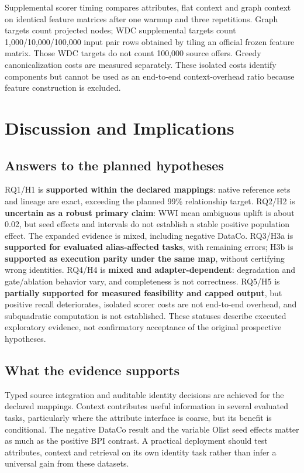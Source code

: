 \documentclass[11pt,letterpaper]{article}
\begin{document}
Supplemental scorer timing compares attributes, flat context and graph context on identical feature matrices after one warmup and three repetitions. Graph targets count projected nodes; WDC supplemental targets count 1,000/10,000/100,000 input pair rows obtained by tiling an official frozen feature matrix. Those WDC targets do not count 100,000 source offers. Greedy canonicalization costs are measured separately. These isolated costs identify components but cannot be used as an end-to-end context-overhead ratio because feature construction is excluded.

\section{Discussion and Implications}
\subsection{Answers to the planned hypotheses}
RQ1/H1 is \textbf{supported within the declared mappings}: native reference sets and lineage are exact, exceeding the planned 99\% relationship target. RQ2/H2 is \textbf{uncertain as a robust primary claim}: WWI mean ambiguous uplift is about 0.02, but seed effects and intervals do not establish a stable positive population effect. The expanded evidence is mixed, including negative DataCo. RQ3/H3a is \textbf{supported for evaluated alias-affected tasks}, with remaining errors; H3b is \textbf{supported as execution parity under the same map}, without certifying wrong identities. RQ4/H4 is \textbf{mixed and adapter-dependent}: degradation and gate/ablation behavior vary, and completeness is not correctness. RQ5/H5 is \textbf{partially supported for measured feasibility and capped output}, but positive recall deteriorates, isolated scorer costs are not end-to-end overhead, and subquadratic computation is not established. These statuses describe executed exploratory evidence, not confirmatory acceptance of the original prospective hypotheses.
\subsection{What the evidence supports}
Typed source integration and auditable identity decisions are achieved for the declared mappings. Context contributes useful information in several evaluated tasks, particularly where the attribute interface is coarse, but its benefit is conditional. The negative DataCo result and the variable Olist seed effects matter as much as the positive BPI contrast. A practical deployment should test attributes, context and retrieval on its own identity task rather than infer a universal gain from these datasets.
\end{document}
